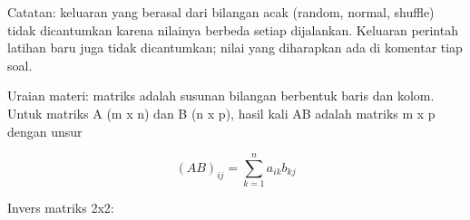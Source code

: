 \documentclass[a4paper,10pt]{article}
\begin{document}
\begin{eulernotebook}
\begin{eulercomment}
\begin{eulercomment}
\begin{eulercomment}
\begin{eulercomment}
\begin{eulercomment}
\begin{eulercomment}
\begin{eulercomment}
\begin{eulercomment}
\begin{eulercomment}
\begin{eulercomment}
\begin{eulercomment}
Catatan: keluaran yang berasal dari bilangan acak (random, normal, shuffle)
tidak dicantumkan karena nilainya berbeda setiap dijalankan. Keluaran
perintah latihan baru juga tidak dicantumkan; nilai yang diharapkan ada di
komentar tiap soal.

\begin{eulercomment}
\begin{eulercomment}
Uraian materi: matriks adalah susunan bilangan berbentuk baris dan kolom.
Untuk matriks A (m x n) dan B (n x p), hasil kali AB adalah matriks m x p
dengan unsur

\end{eulercomment}
\begin{eulerformula}
\[
(AB)_{ij}=\sum_{k=1}^{n} a_{ik}b_{kj}
\]
\end{eulerformula}
\begin{eulercomment}
Invers matriks 2x2:


\end{eulercomment}
\end{eulercomment}
\end{eulercomment}
\end{eulercomment}
\end{eulercomment}
\end{eulercomment}
\end{eulercomment}
\end{eulercomment}
\end{eulercomment}
\end{eulercomment}
\end{eulercomment}
\end{eulercomment}
\end{eulercomment}
\end{eulernotebook}
\end{document}
